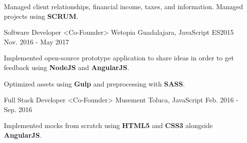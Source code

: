 \begin{cventries}
{\begin{cvitems}
         \item {Managed client relationships, financial income, taxes, and information. Managed projects using \textbf{SCRUM}. }
      \end{cvitems}
    }
  \cventry
    {Software Developer <Co-Founder>}
    {Wetopia}
    {Guadalajara, JavaScript ES2015}
    {Nov. 2016 - May 2017}
    {
      \begin{cvitems}
        \item {Implemented open-source prototype application to share ideas in order to get feedback using \textbf{NodeJS} and \textbf{AngularJS}.}
        \item {Optimized assets using \textbf{Gulp} and preprocessing with \textbf{SASS}. }
      \end{cvitems}
    }
  \cventry
    {Full Stack Developer <Co-Founder>}
    {Musement}
    {Toluca, JavaScript}
    {Feb. 2016 - Sep. 2016}
    {
      \begin{cvitems}
        \item {Implemented mocks from scratch using \textbf{HTML5} and \textbf{CSS3} alongside \textbf{AngularJS}. }
      \end{cvitems}
    }
\end{cventries}
